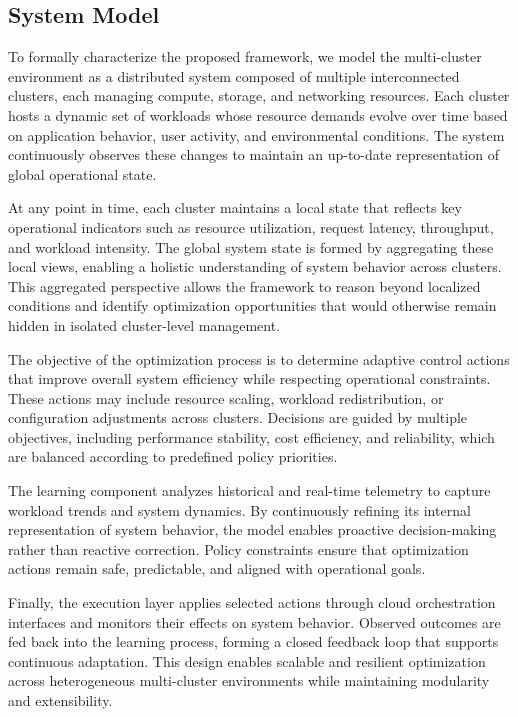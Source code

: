 \documentclass[conference]{IEEEtran}
\begin{document}
\subsection{System Model}

To formally characterize the proposed framework, we model the multi-cluster environment as a distributed system composed of multiple interconnected clusters, each managing compute, storage, and networking resources. Each cluster hosts a dynamic set of workloads whose resource demands evolve over time based on application behavior, user activity, and environmental conditions. The system continuously observes these changes to maintain an up-to-date representation of global operational state.

At any point in time, each cluster maintains a local state that reflects key operational indicators such as resource utilization, request latency, throughput, and workload intensity. The global system state is formed by aggregating these local views, enabling a holistic understanding of system behavior across clusters. This aggregated perspective allows the framework to reason beyond localized conditions and identify optimization opportunities that would otherwise remain hidden in isolated cluster-level management.

The objective of the optimization process is to determine adaptive control actions that improve overall system efficiency while respecting operational constraints. These actions may include resource scaling, workload redistribution, or configuration adjustments across clusters. Decisions are guided by multiple objectives, including performance stability, cost efficiency, and reliability, which are balanced according to predefined policy priorities.

The learning component analyzes historical and real-time telemetry to capture workload trends and system dynamics. By continuously refining its internal representation of system behavior, the model enables proactive decision-making rather than reactive correction. Policy constraints ensure that optimization actions remain safe, predictable, and aligned with operational goals.

Finally, the execution layer applies selected actions through cloud orchestration interfaces and monitors their effects on system behavior. Observed outcomes are fed back into the learning process, forming a closed feedback loop that supports continuous adaptation. This design enables scalable and resilient optimization across heterogeneous multi-cluster environments while maintaining modularity and extensibility.
\end{document}
